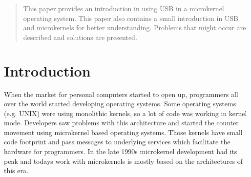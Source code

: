 \documentclass{acm_proc_article-sp}
\begin{document}
\maketitle
\begin{abstract}
This paper provides an introduction in using USB in a microkernel operating system.
This paper also contains a small introduction in USB and microkernels for better understanding.
Problems that might occur are described and solutions are presented.


\end{abstract}



\section{Introduction}
When the market for personal computers started to open up, programmers all over the world
started developing operating systems.
Some operating systems (e.g. UNIX) were using monolithic kernels, so a lot of code
was working in kernel mode.
Developers saw problems with this architecture and started the counter movement using microkernel
based operating systems.
Those kernels have small code footprint and pass messages to underlying services which facilitate
the hardware for programmers.
In the late 1990s microkernel development had its peak and todays work with microkernels is mostly
based on the architectures of this era.
\end{document}
